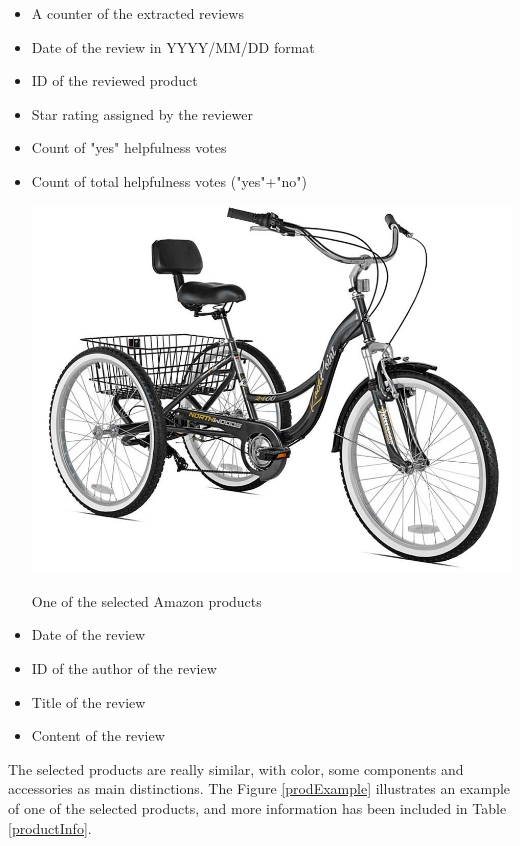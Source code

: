 \begin{itemize}
	\begin{itemize} \itemsep -15pt
		\item A counter of the extracted reviews
		\item Date of the review in \textsc{YYYY/MM/DD} format
		\item ID of the reviewed product
		\item Star rating assigned by the reviewer
		\item Count of "yes" helpfulness votes
		\item Count of total helpfulness votes ("yes"+"no")
		\begin{marginfigure}
			\includegraphics[width=1.2\linewidth]{figs/01/prodExample}
			\caption{One of the selected Amazon products}
			\label{prodExample}
		\end{marginfigure}
		\item Date of the review
		\item ID of the author of the review
		\item Title of the review
		\item Content of the review
	\end{itemize}
\end{itemize}

The selected products are really similar, with color, some components and accessories as main distinctions. The Figure \ref{prodExample} illustrates an example of one of the selected products, and more information has been included in Table \ref{productInfo}.

